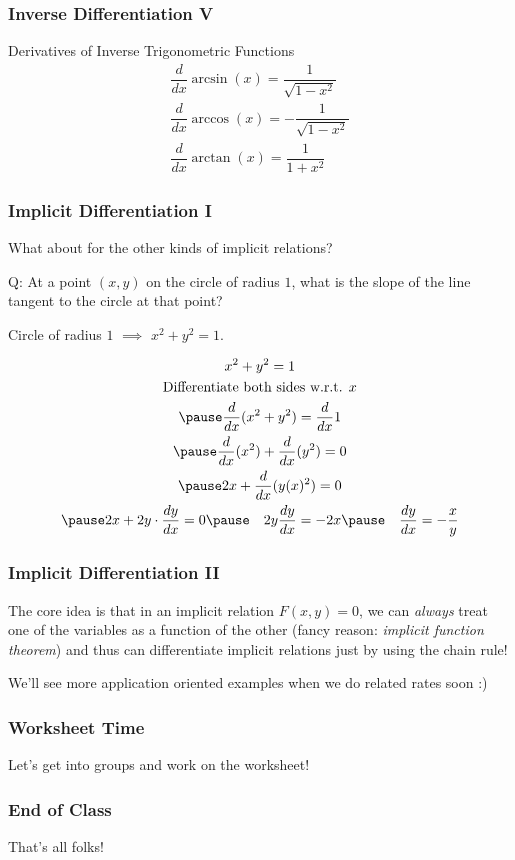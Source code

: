 \documentclass{ltx-talk}
\begin{document}
 \begin{frame}
   \frametitle{Inverse Differentiation V}

   \begin{alertblock}{Derivatives of Inverse Trigonometric Functions}
     \begin{gather}
       \dfrac{d}{dx} \arcsin(x) = \dfrac{1}{\sqrt{1 - x^2}} \\
       \dfrac{d}{dx} \arccos(x) = -\dfrac{1}{\sqrt{1 - x^2}} \\
       \dfrac{d}{dx} \arctan(x) = \dfrac{1}{1 + x^2}
     \end{gather}
   \end{alertblock}
 \end{frame}

 \begin{frame}
   \frametitle{Implicit Differentiation I}
   What about for the other kinds of implicit relations? \pause

   Q: At a point $(x, y)$ on the circle of radius $1$, what is the slope of the line tangent to the circle at that point? \pause

   Circle of radius $1$ $\implies$ $x^2 + y^2 = 1$.

   \begin{gather}
      x^2 + y^2 = 1 \\
      \text{Differentiate both sides w.r.t. } x \\ \pause
      \dfrac{d}{dx}(x^2 + y^2) = \dfrac{d}{dx} 1 \\ \pause
      \dfrac{d}{dx}(x^2) + \dfrac{d}{dx}(y^2) = 0 \\ \pause
      2x + \dfrac{d}{dx} (y(x)^2) = 0 \\ \pause
      2x + 2y \cdot \dfrac{dy}{dx} = 0 \pause \quad 2y \dfrac{dy}{dx} = -2x \pause \quad \dfrac{dy}{dx} = -\dfrac{x}{y}
   \end{gather}
 \end{frame}

 \begin{frame}
   \frametitle{Implicit Differentiation II}

   The core idea is that in an implicit relation $F(x, y) = 0$,
   \pause
   we can \textit{always} treat one of the variables as a function of the other (fancy reason: \textit{implicit function theorem}) \pause
   and thus can differentiate implicit relations just by using the chain rule! \pause

    We'll see more application oriented examples when we do related rates soon :)
 \end{frame}

 \begin{frame}
   \frametitle{Worksheet Time}

   Let's get into groups and work on the worksheet!
 \end{frame}

 \begin{frame}
   \frametitle{End of Class}

   That's all folks!
 \end{frame}
\end{document}
